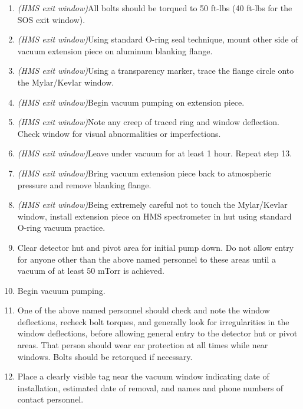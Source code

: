 \begin{enumerate}
\item{{\sl (HMS exit window)}All bolts should be torqued to 50 ft-lbs (40 ft-lbs for the SOS
exit window).}

\item{{\sl (HMS exit window)}Using standard O-ring seal technique, mount other side of
vacuum extension piece on aluminum blanking flange.}

\item{{\sl (HMS exit window)}Using a transparency marker, trace the flange circle onto the
Mylar/Kevlar window.}

\item{{\sl (HMS exit window)}Begin vacuum pumping on extension
piece.} 

\item{{\sl (HMS exit window)}Note any creep of traced ring and window
deflection.  Check window for visual abnormalities or imperfections.}

\item{{\sl (HMS exit window)}Leave under vacuum for at least 1 hour.
Repeat step 13.}

\item{{\sl (HMS exit window)}Bring vacuum extension piece back to
atmospheric pressure and remove blanking flange.}

\item{{\sl (HMS exit window)}Being extremely careful not to touch the
Mylar/Kevlar window, install extension piece on HMS spectrometer in
hut using standard O-ring vacuum practice.}

\item{Clear detector hut and pivot area for initial pump down. Do not
allow entry for anyone other than the above named personnel to
these areas until a vacuum of at least 50 mTorr is achieved.}

\item{Begin vacuum pumping.}

\item{One of the above named personnel should check and note the
window deflections, recheck bolt torques, and generally look for
irregularities in the window deflections, before allowing
general entry to the detector
hut or pivot areas. That person should wear ear protection at all times while
near windows. Bolts should be retorqued if necessary.}

\item{Place a clearly visible tag near the vacuum window indicating
date of installation, estimated date of removal, and names and phone
numbers of contact personnel.}


\end{enumerate}
